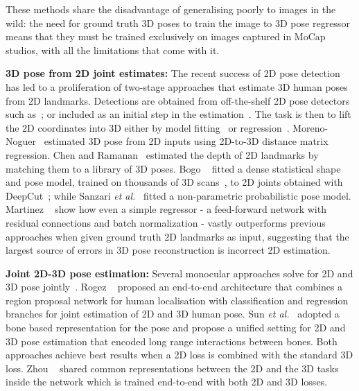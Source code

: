 \documentclass[10pt,twocolumn,letterpaper]{article}
\begin{document}
These methods share the disadvantage of generalising poorly to images in the
wild: the need for ground truth 3D poses to train the image to 3D pose
regressor means that they must be trained exclusively on images captured in
MoCap studios, with all the limitations that come with it.

{\bf 3D pose from 2D joint estimates:} The recent success of 2D pose detection
has led to a proliferation of two-stage approaches that estimate 3D human poses
from 2D landmarks. Detections are obtained from off-the-shelf
2D pose detectors such
as~\cite{wei2016convolutional,newell2016stacked,pishchulin2016deepcut}; or
included as an initial step in the estimation~\cite{lin2017recurrent}. The task
is then to lift the 2D coordinates into 3D either by model
fitting~\cite{ramakrishna2012reconstructing,akhter2015pose,zhou2017sparse,zhou2016sparseness,bogo2016keep,sanzari2016bayesian}
or regression~\cite{martinez2017simple,moreno20173d}.
Moreno-Noguer~\cite{moreno20173d} estimated 3D pose from 2D inputs using
2D-to-3D distance matrix regression. Chen and Ramanan~\cite{chen20173d}
estimated the depth of 2D landmarks by matching them to a library of 3D poses.
Bogo \etal~\cite{bogo2016keep} fitted a dense statistical shape and pose model,
trained on thousands of 3D scans~\cite{loper2015smpl}, to 2D joints obtained
with DeepCut~\cite{pishchulin2016deepcut}; while Sanzari \emph{et
  al.}~\cite{sanzari2016bayesian} fitted a non-parametric probabilistic pose
model. Martinez \etal~\cite{martinez2017simple} show how even a simple regressor
- a feed-forward network with residual connections and batch normalization -
vastly outperforms previous approaches when given ground truth 2D landmarks as
input, suggesting that the largest source of errors in 3D pose reconstruction is
incorrect 2D estimation.

{\bf Joint 2D-3D pose estimation:} Several monocular approaches solve for 2D and
3D pose
jointly~\cite{simo2013joint,tekin2017learning,rogez2017lcr,sun2017compositional}.
Rogez \etal~\cite{rogez2017lcr} proposed an end-to-end
architecture that combines a region proposal network for human
localisation with classification and regression branches for joint
estimation of 2D and 3D human pose. Sun \emph{et
 al.}~\cite{sun2017compositional} adopted a bone based representation
for the pose and propose a unified setting for 2D and 3D pose
estimation that encoded long range interactions between bones. Both
approaches achieve best results when a 2D loss is combined with the
standard 3D loss. Zhou \etal~\cite{zhou2017towards} shared
common representations between the 2D and the 3D tasks inside the
network which is trained end-to-end with both 2D and 3D losses. 
\end{document}
